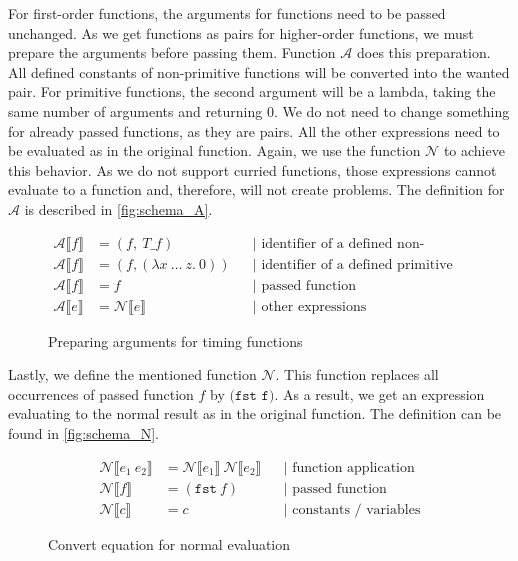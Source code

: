 For first-order functions, the arguments for functions need to be passed unchanged.
As we get functions as pairs for higher-order functions, we must prepare the arguments before passing them.
Function $\mathcal{A}$ does this preparation.
All defined constants of non-primitive functions will be converted into the wanted pair.
For primitive functions, the second argument will be a lambda, taking the same number of arguments and returning $0$.
We do not need to change something for already passed functions, as they are pairs.
All the other expressions need to be evaluated as in the original function.
Again, we use the function $\mathcal{N}$ to achieve this behavior.
As we do not support curried functions, those expressions cannot evaluate to a function and, therefore, will not create problems.
The definition for $\mathcal{A}$ is described in \autoref{fig:schema_A}.
\begin{figure}
  \begin{align*}
    \mathcal{A}\llbracket f\rrbracket &= (f,\ T\_f) &&\text{| identifier of a defined non-primitive function}\\
    \mathcal{A}\llbracket f\rrbracket &= (f, (\lambda x\ \dots\ z.\ 0)) &&\text{| identifier of a defined primitive function}\\
    \mathcal{A}\llbracket f\rrbracket &= f &&\text{| passed function}\\
    \mathcal{A}\llbracket e\rrbracket &= \mathcal{N}\llbracket e\rrbracket &&\text{| other expressions}
  \end{align*}
  \caption{Preparing arguments for timing functions}
  \label{fig:schema_A}
\end{figure}

Lastly, we define the mentioned function $\mathcal{N}$.
This function replaces all occurrences of passed function $f$ by $\texttt{(fst f)}$.
As a result, we get an expression evaluating to the normal result as in the original function.
The definition can be found in \autoref{fig:schema_N}.
\begin{figure}
\begin{align*}
  \mathcal{N}\llbracket e_{1}\ e_{2}\rrbracket &= \mathcal{N}\llbracket e_{1}\rrbracket\ \mathcal{N}\llbracket e_{2}\rrbracket &&\text{| function application}\\
  \mathcal{N}\llbracket f\rrbracket &= (\texttt{fst}\ f) &&\text{| passed function}\\
  \mathcal{N}\llbracket c\rrbracket &= c &&\text{| constants / variables}
\end{align*}
\caption{Convert equation for normal evaluation}
\label{fig:schema_N}
\end{figure}

